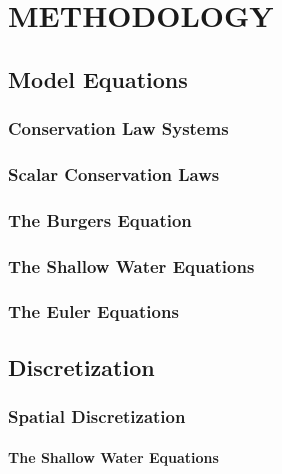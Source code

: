 \chapter{METHODOLOGY}

\section{Model Equations}
\subsection{Conservation Law Systems}
  
\subsection{Scalar Conservation Laws}
  
\subsection{The Burgers Equation}
%  
\subsection{The Shallow Water Equations\label{sec:shallowwater}}
  
\subsection{The Euler Equations}
%  
\section{Discretization}
\subsection{Spatial Discretization\label{sec:spatial_discretization}}
  
  \subsubsection{The Shallow Water Equations}
  
